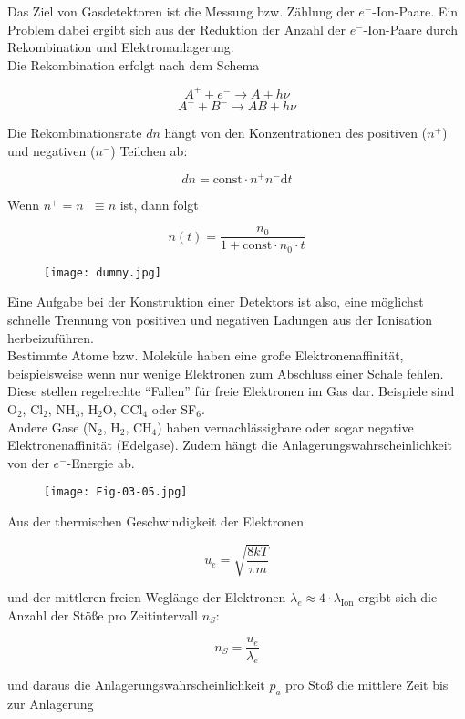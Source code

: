 Das Ziel von Gasdetektoren ist die Messung bzw. Zählung der $e^-$-Ion-Paare. Ein Problem dabei
ergibt sich aus der Reduktion der Anzahl der $e^-$-Ion-Paare durch Rekombination und
Elektronanlagerung.
\\
Die Rekombination erfolgt nach dem Schema

\[A^+ + e^- \longrightarrow A + h\nu \]
\[A^+ + B^- \longrightarrow AB + h\nu  \]

Die Rekombinationsrate $dn$ hängt von den Konzentrationen des positiven ($n^+$) und negativen
($n^-$) Teilchen ab:

\[dn= \text{const}\cdot n^+ n^- \mathrm{d}t \]

Wenn $n^+=n^-\equiv n$ ist, dann folgt

\[n(t) = \frac{n_0}{1+\text{const}\cdot n_0\cdot t}  \]

\begin{figure}[H]
	\centering
	\texttt{[image: dummy.jpg]}
\end{figure}

Eine Aufgabe bei der Konstruktion einer Detektors ist also, eine möglichst schnelle Trennung von
positiven und negativen Ladungen aus der Ionisation herbeizuführen.
\\
Bestimmte Atome bzw. Moleküle haben eine große Elektronenaffinität, beispielsweise wenn nur wenige
Elektronen zum Abschluss einer Schale fehlen. Diese stellen regelrechte "`Fallen"' für
freie Elektronen im Gas dar. Beispiele sind O$_2$, Cl$_2$, NH$_3$, H$_2$O, CCl$_4$ oder SF$_6$.
\\
Andere Gase (N$_2$, H$_2$, CH$_4$) haben vernachlässigbare oder sogar negative
Elektronenaffinität (Edelgase). Zudem hängt die Anlagerungswahrscheinlichkeit von der $e^-$-Energie
ab.

\begin{figure}[H]
	\centering
	\texttt{[image: Fig-03-05.jpg]}
\end{figure}

Aus der thermischen Geschwindigkeit der Elektronen 

\[u_e = \sqrt{\frac{8kT}{\pi m}}  \]

und der mittleren freien Weglänge der Elektronen $\lambda_e \approx 4\cdot \lambda_{\text{Ion}}$
ergibt sich die Anzahl der Stöße pro Zeitintervall $n_S$:

\[ n_S = \frac{u_e}{\lambda_e}  \]

und daraus die Anlagerungswahrscheinlichkeit $p_a$ pro Stoß die mittlere Zeit bis zur Anlagerung

